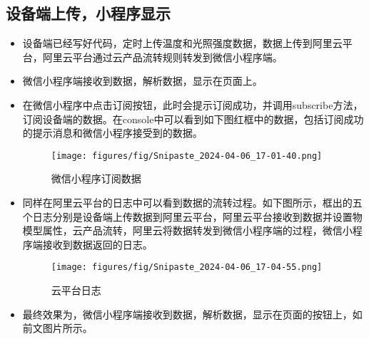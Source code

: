 \documentclass[12pt,hyperref,a4paper,UTF8]{ctexart}
\begin{document}
\subsection{设备端上传，小程序显示}
\begin{itemize}
  \item 设备端已经写好代码，定时上传温度和光照强度数据，数据上传到阿里云平台，阿里云平台通过云产品流转规则转发到微信小程序端。
  \item 微信小程序端接收到数据，解析数据，显示在页面上。
  \item 在微信小程序中点击订阅按钮，此时会提示订阅成功，并调用subscribe方法，订阅设备端的数据。在console中可以看到如下图红框中的数据，包括订阅成功的提示消息和微信小程序接受到的数据。
  \begin{figure}[H]
    \centering
    \texttt{[image: figures/fig/Snipaste\_2024-04-06\_17-01-40.png]}
    \caption{微信小程序订阅数据}
    \label{fig:enter-label}
  \end{figure}
  \item 同样在阿里云平台的日志中可以看到数据的流转过程。如下图所示，框出的五个日志分别是设备端上传数据到阿里云平台，阿里云平台接收到数据并设置物模型属性，云产品流转，阿里云将数据转发到微信小程序端的过程，微信小程序端接收到数据返回的日志。
  \begin{figure}[H]
    \centering
    \texttt{[image: figures/fig/Snipaste\_2024-04-06\_17-04-55.png]}
    \caption{云平台日志}
    \label{fig:enter-label}
  \end{figure}
  \item 最终效果为，微信小程序端接收到数据，解析数据，显示在页面的按钮上，如前文图片所示。
\end{itemize}

\newpage


\appendix
\end{document}
